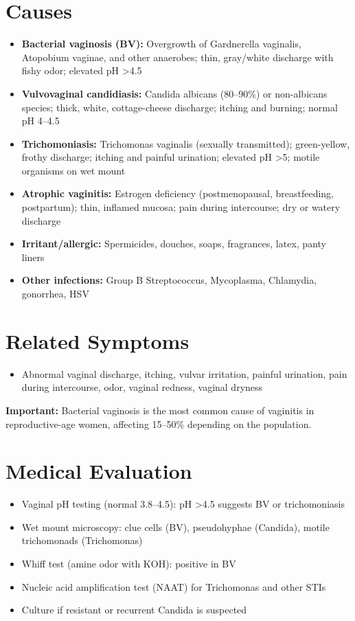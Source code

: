 \section*{Causes}
\begin{itemize}
  \item \textbf{Bacterial vaginosis (BV):} Overgrowth of Gardnerella vaginalis, Atopobium vaginae, and other anaerobes; thin, gray/white discharge with fishy odor; elevated pH >4.5
  \item \textbf{Vulvovaginal candidiasis:} Candida albicans (80--90\%) or non-albicans species; thick, white, cottage-cheese discharge; itching and burning; normal pH 4--4.5
  \item \textbf{Trichomoniasis:} Trichomonas vaginalis (sexually transmitted); green-yellow, frothy discharge; itching and painful urination; elevated pH >5; motile organisms on wet mount
  \item \textbf{Atrophic vaginitis:} Estrogen deficiency (postmenopausal, breastfeeding, postpartum); thin, inflamed mucosa; pain during intercourse; dry or watery discharge
  \item \textbf{Irritant/allergic:} Spermicides, douches, soaps, fragrances, latex, panty liners
  \item \textbf{Other infections:} Group B Streptococcus, Mycoplasma, Chlamydia, gonorrhea, HSV
\end{itemize}

\section*{Related Symptoms}
\begin{itemize}
  \item Abnormal vaginal discharge, itching, vulvar irritation, painful urination, pain during intercourse, odor, vaginal redness, vaginal dryness
\end{itemize}
\textbf{Important:} Bacterial vaginosis is the most common cause of vaginitis in reproductive-age women, affecting 15--50\% depending on the population.

\section*{Medical Evaluation}
\begin{itemize}
  \item Vaginal pH testing (normal 3.8--4.5): pH >4.5 suggests BV or trichomoniasis
  \item Wet mount microscopy: clue cells (BV), pseudohyphae (Candida), motile trichomonads (Trichomonas)
  \item Whiff test (amine odor with KOH): positive in BV
  \item Nucleic acid amplification test (NAAT) for Trichomonas and other STIs
  \item Culture if resistant or recurrent Candida is suspected
\end{itemize}

